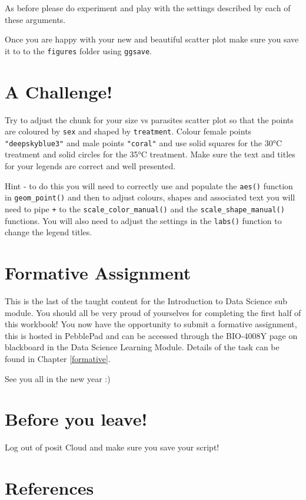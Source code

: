 \documentclass[
]{book}
\begin{document}
As before please do experiment and play with the settings described by each of these arguments.

Once you are happy with your new and beautiful scatter plot make sure you save it to to the \texttt{figures} folder using \texttt{ggsave}.

\section{A Challenge!}\label{a-challenge}

Try to adjust the chunk for your size vs parasites scatter plot so that the points are coloured by \texttt{sex} and shaped by \texttt{treatment}. Colour female points \texttt{"deepskyblue3"} and male points \texttt{"coral"} and use solid squares for the 30°C treatment and solid circles for the 35°C treatment. Make sure the text and titles for your legends are correct and well presented.

Hint - to do this you will need to correctly use and populate the \texttt{aes()} function in \texttt{geom\_point()} and then to adjust colours, shapes and associated text you will need to pipe \texttt{+} to the \texttt{scale\_color\_manual()} and the \texttt{scale\_shape\_manual()} functions. You will also need to adjust the settings in the \texttt{labs()} function to change the legend titles.

\section{Formative Assignment}\label{formative-assignment}

This is the last of the taught content for the Introduction to Data Science sub module. You should all be very proud of yourselves for completing the first half of this workbook! You now have the opportunity to submit a formative assignment, this is hosted in PebblePad and can be accessed through the BIO-4008Y page on blackboard in the Data Science Learning Module. Details of the task can be found in Chapter \ref{formative}.

See you all in the new year :)

\section{Before you leave!}\label{before-you-leave-6}

Log out of posit Cloud and make sure you save your script!

\section{References}\label{references-7}
\end{document}
